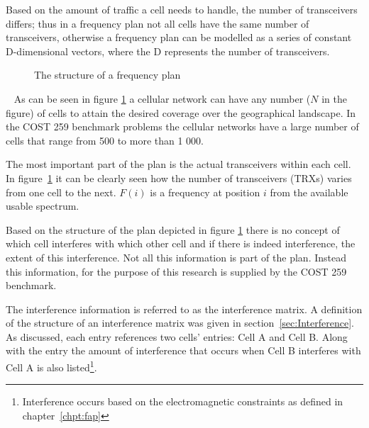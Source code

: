 Based on the amount of traffic a cell needs to handle, the number of transceivers differs; thus in a frequency plan not all cells have the same number of transceivers, otherwise a frequency plan can be modelled as a series of constant D-dimensional vectors, where the D represents the number of transceivers. 
~
\begin{figure}[ht]
	\centering
	\setlength \fboxsep{0pt}
	\setlength \fboxrule{0.5pt}
	\caption{The structure of a frequency plan}
	\label{fig:fapPlan}
\end{figure}
~
As can be seen in figure \ref{fig:fapPlan} a cellular network can have any number ($N$ in the figure) of cells to attain the desired coverage over the geographical landscape. In the COST 259 benchmark problems the cellular networks have a large number of cells that range from 500 to more than 1 000. 

The most important part of the plan is the actual transceivers within each cell. In figure~\ref{fig:fapPlan} it can be clearly seen how the number of transceivers (TRXs) varies from one cell to the next. $F(i)$ is a frequency at position $i$ from the available usable spectrum. 

Based on the structure of the plan depicted in figure \ref{fig:fapPlan} there is no concept of which cell interferes with which other cell and if there is indeed interference, the extent of this interference. Not all this information is part of the plan. Instead this information, for the purpose of this research is supplied by the COST 259 benchmark. 

The interference information is referred to as the interference matrix. A definition of the structure of an interference matrix was given in section~\ref{sec:Interference}. As discussed, each entry references two cells' entries: Cell A and Cell B. Along with the entry the amount of interference that occurs when Cell B interferes with Cell A is also listed\footnote{Interference occurs based on the electromagnetic constraints as defined in chapter~\ref{chpt:fap}}.

